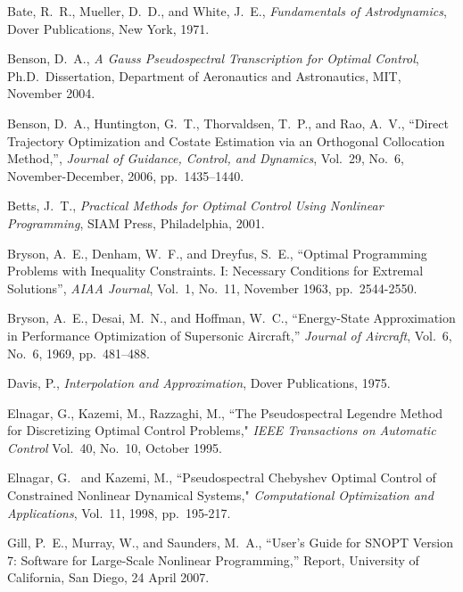\documentclass[10pt,final]{report}
\begin{document}
\begin{thebibliography}{}

   Bate, R.~R., Mueller, D.~D., and
  White, J.~E., {\em Fundamentals of Astrodynamics}, Dover Publications, New
  York, 1971.

   Benson, D.~A., {\em A Gauss
    Pseudospectral Transcription for Optimal Control}, Ph.D.~Dissertation,
  Department of Aeronautics and Astronautics, MIT, November 2004.

   Benson, D.~A., Huntington,
  G.~T., Thorvaldsen, T.~P., and Rao, A.~V., ``Direct Trajectory
  Optimization and Costate Estimation via an Orthogonal Collocation
  Method,'', {\em Journal of Guidance, Control, and Dynamics},
  Vol.~29, No.~6, November-December, 2006, pp.~1435--1440.

   Betts, J.~T., {\em Practical Methods for
    Optimal Control Using Nonlinear Programming}, SIAM Press, Philadelphia,
  2001.

   Bryson, A.~E., Denham, W.~F.,
  and Dreyfus, S.~E., ``Optimal Programming Problems with Inequality Constraints.
  I: Necessary Conditions for Extremal Solutions'', {\em AIAA Journal}, Vol.~1, No.~11,
  November 1963, pp.~2544-2550.

   Bryson, A.~E., Desai,
  M.~N., and Hoffman, W.~C., ``Energy-State Approximation in
  Performance Optimization of Supersonic Aircraft,'' {\em Journal of
    Aircraft}, Vol.~6, No.~6, 1969, pp.~481--488.

   Davis, P.,  {\em Interpolation and
    Approximation}, Dover Publications, 1975.

   Elnagar, G., Kazemi, M., Razzaghi,
  M., ``The Pseudospectral Legendre Method for Discretizing Optimal Control
  Problems," {\em IEEE Transactions on Automatic Control} Vol.~40, No.~10,
  October 1995.

   Elnagar, G.~ and Kazemi, M.,
  ``Pseudospectral Chebyshev Optimal Control of Constrained Nonlinear
  Dynamical Systems," {\em Computational Optimization and Applications},
  Vol.~11, 1998, pp.~195-217.

   Gill, P.~E., Murray, W.,
  and Saunders, M.~A., ``User's Guide for SNOPT Version 7:  Software
  for Large-Scale Nonlinear Programming,'' Report, University of
  California, San Diego, 24 April 2007.


\end{thebibliography}
\end{document}
